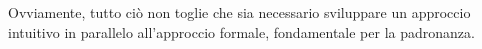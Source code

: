Ovviamente, tutto ciò non toglie che sia necessario sviluppare un approccio
intuitivo in parallelo all'approccio formale, fondamentale per la padronanza.
%
